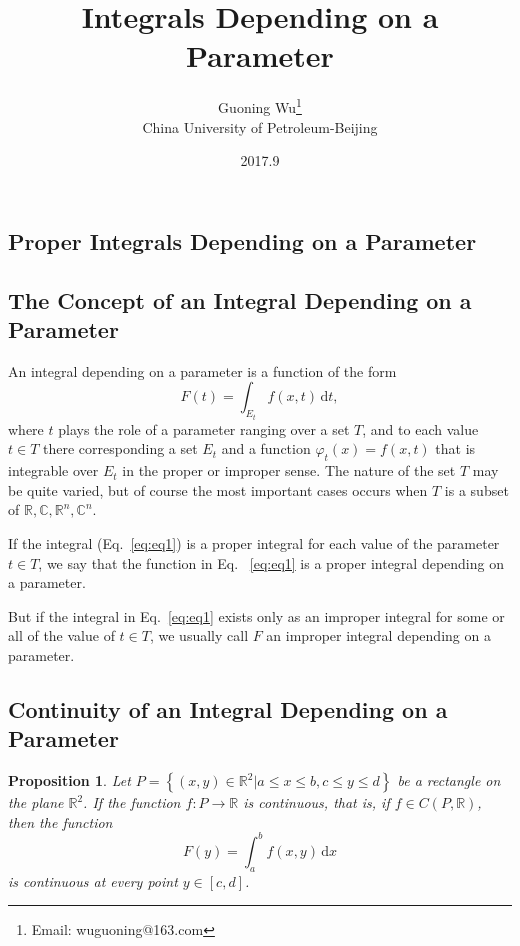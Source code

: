 \documentclass[a4paper,12pt]{article}
\newtheorem{proposition}{Proposition}
\begin{document}
\begin{CJK}{UTF8}{gbsn}
\title{Integrals Depending on a Parameter}
\author{Guoning Wu\footnote{Email: wuguoning@163.com}\\[2ex]
 China University of Petroleum-Beijing\\[2ex]}
\date{2017.9}
\maketitle

\section{Proper Integrals Depending on a Parameter}
    \subsection{The Concept of an Integral Depending on a Parameter}
    An integral depending on a parameter is a function of the form 
    \begin{equation}
        F(t) = \int_{E_t} f(x,t)\, \mathrm{d}t,
        \label{eq:eq1}
    \end{equation}
    where $t$ plays the role of a parameter ranging over a set $T$, and 
    to each value $t \in T$ there corresponding a set $E_t$  and a function 
    $\varphi_t(x) = f(x,t)$ that is integrable over $E_t$ in the proper or improper 
    sense. The nature of the set $T$ may be quite varied, but of course 
    the most important cases occurs when $T$ is a subset of $\mathbb{R},
    \mathbb{C}, \mathbb{R}^n, \mathbb{C}^n$.

    If the integral (Eq.~\ref{eq:eq1}) is a proper integral for each 
    value of the parameter $t \in T$, we say that the function in Eq.
    ~\ref{eq:eq1} is a proper integral depending on a parameter.

    But if the integral in Eq.~\ref{eq:eq1} exists only as an improper 
    integral for some or all of the value of $t \in T$, we usually call 
    $F$  an improper integral depending on a parameter.

    \subsection{Continuity of an Integral Depending on a Parameter}
    \begin{proposition}
        Let $P = \left\{\left(x,y\right)\in \mathbb{R}^2 \vert a \le x \le b,
        c \le y \le d\right\}$ be a rectangle on the plane $\mathbb{R}^2$.
        If the function $f: P \to \mathbb{R}$ is continuous, that is, if 
        $f \in C(P,\mathbb{R})$, then the function 
        \begin{equation}
            F(y) = \int_a^bf(x,y)\,\mathrm{d}x
            \label{eq:eq2}
        \end{equation}
        is continuous at every point $y \in [c,d]$.
    \end{proposition}


\end{CJK}
\end{document}
